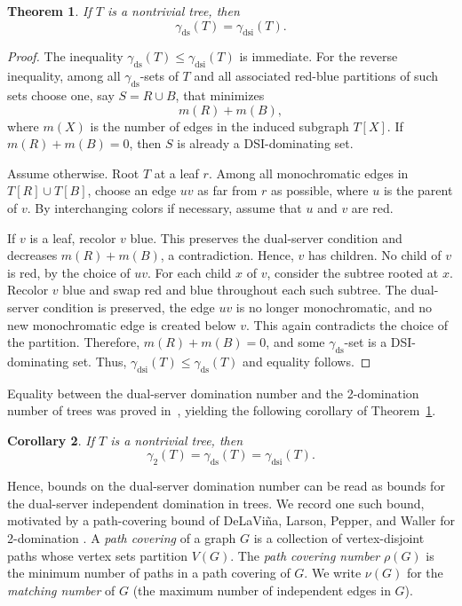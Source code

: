 \documentclass[11pt]{article}
\newtheorem{theorem}{Theorem}
\newtheorem{corollary}[theorem]{Corollary}
\theoremstyle{definition}
\theoremstyle{remark}
\newcommand{\ds}{\mathrm{ds}}
\newcommand{\dsi}{\mathrm{dsi}}
\begin{document}
\begin{theorem}
\label{thm:trees-ds-dsi}
If \(T\) is a nontrivial tree, then
\[
   \gamma_{\ds}(T)=\gamma_{\dsi}(T).
\]
\end{theorem}

\begin{proof}
The inequality \(\gamma_{\ds}(T)\le \gamma_{\dsi}(T)\) is immediate. For the
reverse inequality, among all $\gamma_{\ds}$-sets of $T$ and 
all associated red-blue partitions of such sets choose one, say
\(S=R\cup B\), that minimizes
\[
   m(R)+m(B),
\]
where \(m(X)\) is the number of edges in the induced subgraph \(T[X]\).
If \(m(R)+m(B)=0\), then \(S\) is already a DSI-dominating set.

Assume otherwise. Root \(T\) at a leaf \(r\). Among all monochromatic edges
in \(T[R]\cup T[B]\), choose an edge \(uv\) as far from \(r\) as possible,
where \(u\) is the parent of \(v\). By interchanging colors if necessary,
assume that \(u\) and \(v\) are red.

If \(v\) is a leaf, recolor \(v\) blue. This preserves the dual-server
condition and decreases \(m(R)+m(B)\), a contradiction. Hence, \(v\) has
children. No child of \(v\) is red, by the choice of \(uv\). For each child
\(x\) of \(v\), consider the subtree rooted at \(x\). Recolor \(v\) blue and
swap red and blue throughout each such subtree. The dual-server condition is
preserved, the edge \(uv\) is no longer monochromatic, and no new
monochromatic edge is created below \(v\). This again contradicts the choice
of the partition. Therefore, \(m(R)+m(B)=0\), and some \(\gamma_{\ds}\)-set is
a DSI-dominating set.  Thus, \(\gamma_{\dsi}(T) \le \gamma_{\ds}(T)\) and equality follows.
\end{proof}

 Equality between the 
dual-server domination number and the 2-domination number of trees was proved in~\cite{chh}, yielding the following corollary of Theorem~\ref{thm:trees-ds-dsi}.

\begin{corollary}
\label{cor:trees}
If \(T\) is a nontrivial tree, then
\[
   \gamma_2(T)=\gamma_{\ds}(T)=\gamma_{\dsi}(T).
\]
\end{corollary}



Hence, bounds on the  dual-server domination  number  can be
read as bounds for the dual-server independent domination in trees.  We record one such bound, motivated by a
path-covering bound of DeLaVi\~na, Larson, Pepper, and Waller for
2-domination \cite{DelavinaLarsonPepperWaller10}. A \emph{path covering} of
a graph \(G\) is a collection of vertex-disjoint paths whose vertex sets
partition \(V(G)\).  The \emph{path covering number} \(\rho(G)\) is the
minimum number of paths in   a path covering of \(G\). We write \(\nu(G)\) for the
\emph{matching number} of \(G\) (the maximum number of independent edges in $G$).
\end{document}
